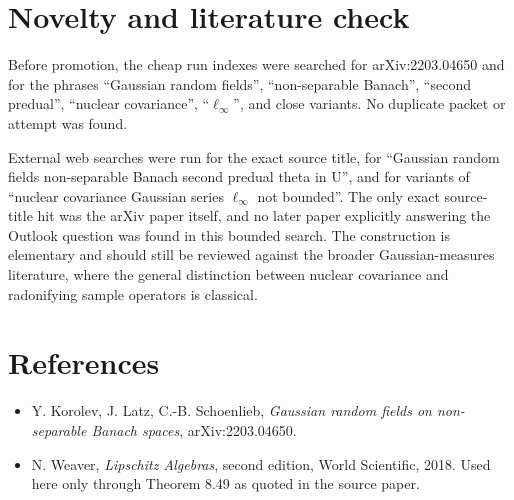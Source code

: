 \documentclass[11pt]{article}
\begin{document}
\section*{Novelty and literature check}

Before promotion, the cheap run indexes were searched for arXiv:2203.04650 and
for the phrases ``Gaussian random fields'', ``non-separable Banach'', ``second
predual'', ``nuclear covariance'', ``\(\ell_\infty\)'', and close variants.
No duplicate packet or attempt was found.

External web searches were run for the exact source title, for
``Gaussian random fields non-separable Banach second predual theta in U'', and
for variants of ``nuclear covariance Gaussian series \(\ell_\infty\) not
bounded''.  The only exact source-title hit was the arXiv paper itself, and no
later paper explicitly answering the Outlook question was found in this
bounded search.  The construction is elementary and should still be reviewed
against the broader Gaussian-measures literature, where the general distinction
between nuclear covariance and radonifying sample operators is classical.

\section*{References}

\begin{itemize}
\item Y. Korolev, J. Latz, C.-B. Schoenlieb, \emph{Gaussian random fields on
non-separable Banach spaces}, arXiv:2203.04650.
\item N. Weaver, \emph{Lipschitz Algebras}, second edition, World Scientific,
2018.  Used here only through Theorem 8.49 as quoted in the source paper.
\end{itemize}
\end{document}
